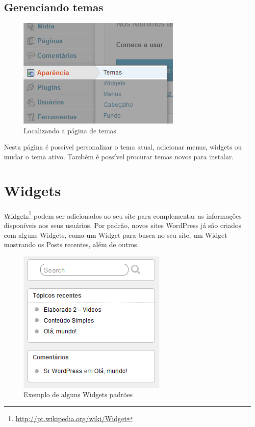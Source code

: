 \documentclass[12pt,onecolumn]{article}
\begin{document}
	\subsection{Gerenciando temas}
		\begin{figure}[H]
			\centering
			\includegraphics{tema1.png}
			\caption{Localizando a página de temas}
		\end{figure}
		Nesta página é possível personalizar o tema atual, adicionar menus, widgets
		ou mudar o tema ativo. Também é possível procurar temas novos para instalar.
		
\clearpage
\section{Widgets}
	\href{http://pt.wikipedia.org/wiki/Widget}{Widgets}\footnote{\url{http://pt.wikipedia.org/wiki/Widget}} podem ser adicionados ao seu site para 
	complementar as informações disponíveis aos seus usuários. Por padrão, novos sites WordPress
	já são criados com alguns Widgets, como um Widget para busca no seu site, um Widget mostrando 
	os Posts recentes, além de outros.
	\begin{figure}[H]
		\centering
		\includegraphics{widgets1.png}
		\caption{Exemplo de alguns Widgets padrões}
	\end{figure}
\end{document}

